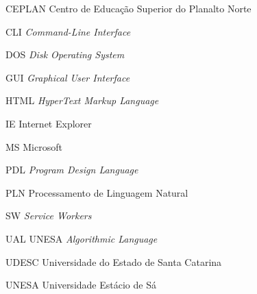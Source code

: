 
\begin{siglas}
  \item[CEPLAN] Centro de Educação Superior do Planalto Norte
  \item[CLI] \textit{Command-Line Interface}
  \item[DOS] \textit{Disk Operating System}
  \item[GUI] \textit{Graphical User Interface}
  \item[HTML] \textit{HyperText Markup Language}
  \item[IE] Internet Explorer
  \item[MS] Microsoft
  \item[PDL] \textit{Program Design Language}
  \item[PLN] Processamento de Linguagem Natural
  \item[SW] \textit{Service Workers}
  \item[UAL] UNESA \textit{Algorithmic Language}
  \item[UDESC] Universidade do Estado de Santa Catarina
  \item[UNESA] Universidade Estácio de Sá
\end{siglas}
